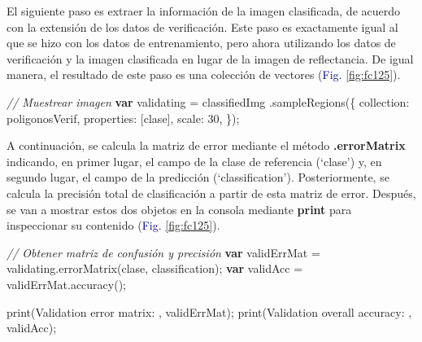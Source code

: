 \documentclass[
  12pt,
  letterpaper,
  twoside]{book}
\newenvironment{Shaded}{\begin{snugshade}}{\end{snugshade}}
\newcommand{\CommentTok}[1]{\textcolor[rgb]{0.24,0.58,0.00}{\textit{#1}}}
\newcommand{\DataTypeTok}[1]{\textcolor[rgb]{0.00,0.00,0.00}{#1}}
\newcommand{\DecValTok}[1]{\textcolor[rgb]{0.28,0.53,0.93}{#1}}
\newcommand{\FunctionTok}[1]{\textcolor[rgb]{0.48,0.12,0.64}{#1}}
\newcommand{\KeywordTok}[1]{\textcolor[rgb]{0.00,0.00,0.00}{\textbf{#1}}}
\newcommand{\NormalTok}[1]{#1}
\newcommand{\OperatorTok}[1]{\textcolor[rgb]{0.00,0.00,0.00}{#1}}
\newcommand{\StringTok}[1]{\textcolor[rgb]{0.87,0.29,0.22}{#1}}
\newcommand\boldpurple[1]{\textcolor{darkpurple}{\textbf{#1}}}
\begin{document}
El siguiente paso es extraer la información de la imagen clasificada, de acuerdo con la extensión de los datos de verificación. Este paso es exactamente igual al que se hizo con los datos de entrenamiento, pero ahora utilizando los datos de verificación y la imagen clasificada en lugar de la imagen de reflectancia. De igual manera, el resultado de este paso es una colección de vectores (\textcolor{darkblue}{Fig.} \ref{fig:fc125}).

\begin{Shaded}
\begin{Highlighting}[]
\CommentTok{// Muestrear imagen}
\KeywordTok{var}\NormalTok{ validating }\OperatorTok{=}\NormalTok{ classifiedImg}
  \OperatorTok{.}\FunctionTok{sampleRegions}\NormalTok{(\{}
  \DataTypeTok{collection}\OperatorTok{:}\NormalTok{ poligonosVerif}\OperatorTok{,}
  \DataTypeTok{properties}\OperatorTok{:}\NormalTok{ [}\StringTok{\textquotesingle{}clase\textquotesingle{}}\NormalTok{]}\OperatorTok{,}
  \DataTypeTok{scale}\OperatorTok{:} \DecValTok{30}\OperatorTok{,}
\NormalTok{\})}\OperatorTok{;}
\end{Highlighting}
\end{Shaded}

A continuación, se calcula la matriz de error mediante el método \boldpurple{.errorMatrix} indicando, en primer lugar, el campo de la clase de referencia (`clase') y, en segundo lugar, el campo de la predicción (`classification'). Posteriormente, se calcula la precisión total de clasificación a partir de esta matriz de error. Después, se van a mostrar estos dos objetos en la consola mediante \boldpurple{print} para inspeccionar su contenido (\textcolor{darkblue}{Fig.} \ref{fig:fc125}).

\begin{Shaded}
\begin{Highlighting}[]
\CommentTok{// Obtener matriz de confusión y precisión}
\KeywordTok{var}\NormalTok{ validErrMat }\OperatorTok{=}\NormalTok{ validating}\OperatorTok{.}\FunctionTok{errorMatrix}\NormalTok{(}\StringTok{\textquotesingle{}clase\textquotesingle{}}\OperatorTok{,} \StringTok{\textquotesingle{}classification\textquotesingle{}}\NormalTok{)}\OperatorTok{;}
\KeywordTok{var}\NormalTok{ validAcc }\OperatorTok{=}\NormalTok{ validErrMat}\OperatorTok{.}\FunctionTok{accuracy}\NormalTok{()}\OperatorTok{;}

\FunctionTok{print}\NormalTok{(}\StringTok{\textquotesingle{}Validation error matrix: \textquotesingle{}}\OperatorTok{,}\NormalTok{ validErrMat)}\OperatorTok{;}
\FunctionTok{print}\NormalTok{(}\StringTok{\textquotesingle{}Validation overall accuracy: \textquotesingle{}}\OperatorTok{,}\NormalTok{ validAcc)}\OperatorTok{;}
\end{Highlighting}
\end{Shaded}
\end{document}
